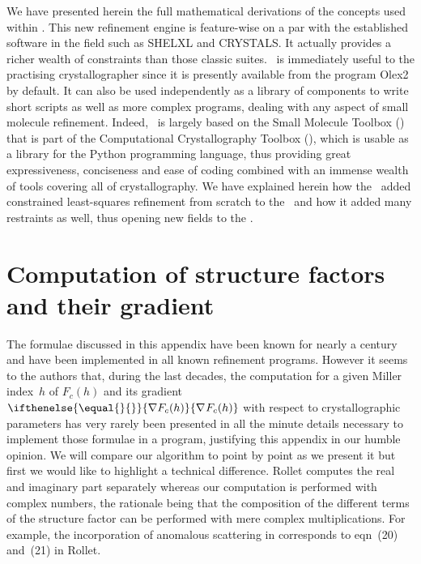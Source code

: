 \documentclass[11pt]{article}
\newcommand{\grad}[2][]{%
        \ifthenelse{ \equal{#1}{} } { \nabla #2 }
                                              { \nabla_{#1} {#2} }
}
\begin{document}
We have presented herein the full mathematical derivations of the concepts used within \olexrefine. This new refinement engine is feature-wise on a par with the established software in the field such as SHELXL and CRYSTALS. It actually provides a richer wealth of constraints than those classic suites. \Olexrefine\ is immediately useful to the practising crystallographer since it is presently available from the program Olex2 by default. It can also be used independently as a library of components to write short scripts as well as more complex programs, dealing with any aspect of small molecule refinement. Indeed, \olexrefine\ is largely based on the Small Molecule Toolbox (\smtbx) that is part of the Computational Crystallography Toolbox (\cctbx), which is usable as a library for the Python programming language, thus providing great expressiveness, conciseness and ease of coding combined with an immense wealth of tools covering all of crystallography. We have explained herein how the \smtbx\ added constrained least-squares refinement from scratch to the \cctbx\ and how it added many restraints as well, thus opening new fields to the \cctbx.

\appendix

\section{Computation of structure factors and their gradient}
\label{appendix:structurefactorlinearisation}
The formulae discussed in this appendix have been known for nearly a century and have been implemented in all known refinement programs. However it seems to the authors that, during the last decades, the computation for a given Miller index~$h$ of $F_c(h)$ and its gradient $\grad{F_c(h)}$ with respect to crystallographic parameters has very rarely been presented in all the minute details necessary to implement those formulae in a program, justifying this appendix in our humble opinion. We will compare our algorithm to  point by point as we present it but first we would like to highlight a technical difference. Rollet computes the real and imaginary part separately whereas our computation is performed with complex numbers, the rationale being that the composition of the different terms of the structure factor can be performed with mere complex multiplications. For example, the incorporation of anomalous scattering in  corresponds to eqn~(20) and~(21) in Rollet.
\end{document}
